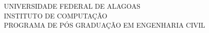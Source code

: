 \begin{capa}
	\center
	UNIVERSIDADE FEDERAL DE ALAGOAS\\
	INSTITUTO DE COMPUTAÇÃO\\
	PROGRAMA DE PÓS GRADUAÇÃO EM ENGENHARIA CIVIL

	\vfill
	\MakeUppercase{\imprimirautor}

    \vfill
    \textbf{\imprimirtitulo}
    \vfill
    
    \vfill
    \imprimirlocal
    \par
    \imprimirdata

    \vspace*{1cm}
\end{capa}
